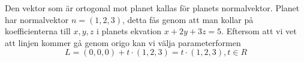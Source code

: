 \documentclass[../../main.tex]{subfiles}
\begin{document}
\begin{solution}{8}
Den vektor som är ortogonal mot planet kallas för planets normalvektor. Planet har normalvektor $n = (1, 2, 3)$, detta fås genom att man kollar på koefficienterna till $x, y, z$ i planets ekvation $x+2y+3z=5$. Eftersom att vi vet att linjen kommer gå genom origo kan vi välja parameterformen
\[L = (0, 0, 0) + t \cdot (1, 2, 3) = t \cdot (1, 2, 3), t \in R\]
\end{solution}
\end{document}
